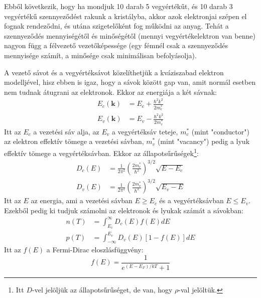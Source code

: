 \documentclass[../main.tex]{subfiles}
\begin{document}
Ebből következik, hogy ha mondjuk 10 darab 5 vegyértékűt, és 10 darab 3 vegyértékű szennyeződést rakunk a kristályba, akkor azok elektronjai szépen el fognak rendeződni, és utána szigetelőként fog működni az anyag.
Tehát a szennyeződés mennyiségétől és minőségétől (mennyi vegyértékelektron van benne) nagyon függ a félvezető vezetőképessége (egy fémnél csak a szennyeződés mennyisége számít, a minősége csak minimálisan befolyásolja).

A vezető sávot és a vegyértéksávot közelíthetjük a kváziszabad elektron modelljével, hisz ebben is igaz, hogy a sávok között gap van, amit normál esetben nem tudnak átugrani az elektronok. Ekkor az energiája a két sávnak:
\begin{equation}
    \begin{aligned}
        E_c (\mathbf{k}) &= E_c + \frac{\hbar^2 k^2}{2 m_c^*} \\
        E_v (\mathbf{k}) &= E_v - \frac{\hbar^2 k^2}{2 m_v^*}
    \end{aligned}
\end{equation}
Itt az $E_c$ a vezetési sáv alja, az $E_v$ a vegyértéksáv teteje, $m_c^*$ (mint "conductor") az elektron effektív tömege a vezetési sávban, $m_v^*$ (mint "vacancy") pedig a lyuk effektív tömege a vegyértéksávban.
Ekkor az állapotsűrűségek\footnote{
    Itt $D$-vel jelöljük az állapotsűrűséget, de van, hogy $\rho$-val jelöltük.
}:
\begin{equation}
    \begin{aligned}
        D_c (E) &= \frac{1}{2 \pi^2} \left(\frac{2 m_c^*}{\hbar^2}\right)^{3/2} \sqrt{E - E_c} \\
        D_v (E) &= \frac{1}{2 \pi^2} \left(\frac{2 m_v^*}{\hbar^2}\right)^{3/2} \sqrt{E_v - E}
    \end{aligned}
\end{equation}
Itt az $E$ az energia, ami a vezetési sávban $E \geq E_c$ és a vegyértéksávban $E \leq E_v$. Ezekből pedig ki tudjuk számolni az elektronok és lyukak számát a sávokban:
\begin{equation}
    \begin{aligned}
        n(T) &= \int_{E_c}^{\infty} D_c (E) f(E) dE \\
        p(T) &= \int_{-\infty}^{E_v} D_v (E) [1 - f(E)] dE
    \end{aligned}
\end{equation}
Itt az $f(E)$ a Fermi-Dirac eloszlásfüggvény:
\begin{equation}
    f(E) = \frac{1}{e^{(E - E_F) / kT} + 1}
\end{equation}
\end{document}
